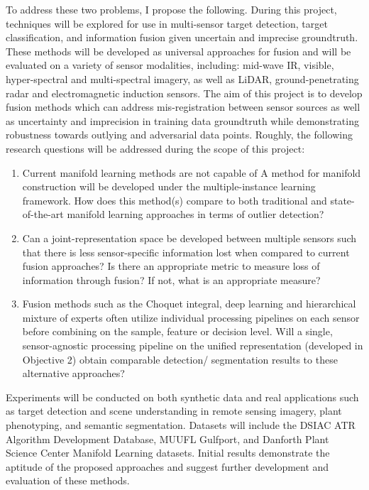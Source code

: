 To address these two problems, I propose the following.  During this project, techniques will be explored for use in multi-sensor target detection, target classification, and information fusion given uncertain and imprecise groundtruth.  These methods will be developed as universal approaches for fusion and will be evaluated on a variety of sensor modalities, including: mid-wave IR, visible, hyper-spectral and multi-spectral imagery, as well as LiDAR, ground-penetrating radar and electromagnetic induction sensors.  The aim of this project is to develop fusion methods which can address mis-registration between sensor sources as well as uncertainty and imprecision in training data groundtruth while demonstrating robustness towards outlying and adversarial data points. Roughly, the following research questions will be addressed during the scope of this project:
\begin{enumerate}
	\item Current manifold learning methods are not capable of  A method for manifold construction will be developed under the multiple-instance learning framework.  How does this method(s) compare to both traditional and state-of-the-art manifold learning approaches in terms of outlier detection?
	\item Can a joint-representation space be developed between multiple sensors such that there is less sensor-specific information lost when compared to current fusion approaches? Is there an appropriate metric to measure loss of information through fusion?  If not, what is an appropriate measure?
	\item Fusion methods such as the Choquet integral, deep learning and hierarchical mixture of experts often utilize individual processing pipelines on each sensor before combining on the sample, feature or decision level.  Will a single, sensor-agnostic processing pipeline on the unified representation (developed in Objective 2) obtain comparable detection/ segmentation results to these alternative approaches?
\end{enumerate} 

Experiments will be conducted on both synthetic data and real applications such as target detection and scene understanding in remote sensing imagery, plant phenotyping, and semantic segmentation.  Datasets will include the DSIAC ATR Algorithm Development Database, MUUFL Gulfport, and Danforth Plant Science Center Manifold Learning datasets.  Initial results demonstrate the aptitude of the proposed approaches and suggest further development and evaluation of these methods.

